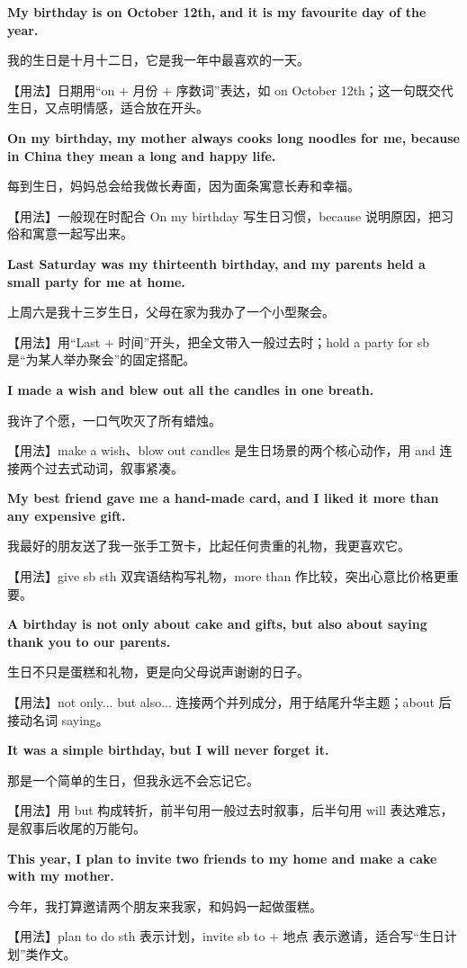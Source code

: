 \documentclass[UTF8,a4paper,11pt,oneside]{ctexbook}
\newcommand{\fansection}[1]{%
  \par\addvspace{2.4ex}%
  \Needspace{6\baselineskip}%
  \noindent{\sffamily\Large\bfseries\color{mainblue}#1}\par
  \nopagebreak
  \addvspace{0.2ex}%
  \noindent{\color{rulelight}\rule{\linewidth}{0.9pt}}\par
  \addvspace{0.9ex}%
  \nobreak
}
\newcommand{\fanpat}[3]{%
  \item{\bfseries #1}\par\nopagebreak
  {\small\color{textgray}#2}\par\nopagebreak
  {\footnotesize\color{accent!90!black}【用法】#3}\par
}
\begin{document}
\fansection{〇、本单元写作常用句型}
\begin{fanpatterns}
\fanpat{My birthday is on October 12th, and it is my favourite day of the year.}{我的生日是十月十二日，它是我一年中最喜欢的一天。}{日期用“on + 月份 + 序数词”表达，如 on October 12th；这一句既交代生日，又点明情感，适合放在开头。}

\fanpat{On my birthday, my mother always cooks long noodles for me, because in China they mean a long and happy life.}{每到生日，妈妈总会给我做长寿面，因为面条寓意长寿和幸福。}{一般现在时配合 On my birthday 写生日习惯，because 说明原因，把习俗和寓意一起写出来。}

\fanpat{Last Saturday was my thirteenth birthday, and my parents held a small party for me at home.}{上周六是我十三岁生日，父母在家为我办了一个小型聚会。}{用“Last + 时间”开头，把全文带入一般过去时；hold a party for sb 是“为某人举办聚会”的固定搭配。}

\fanpat{I made a wish and blew out all the candles in one breath.}{我许了个愿，一口气吹灭了所有蜡烛。}{make a wish、blow out candles 是生日场景的两个核心动作，用 and 连接两个过去式动词，叙事紧凑。}

\fanpat{My best friend gave me a hand-made card, and I liked it more than any expensive gift.}{我最好的朋友送了我一张手工贺卡，比起任何贵重的礼物，我更喜欢它。}{give sb sth 双宾语结构写礼物，more than 作比较，突出心意比价格更重要。}

\fanpat{A birthday is not only about cake and gifts, but also about saying thank you to our parents.}{生日不只是蛋糕和礼物，更是向父母说声谢谢的日子。}{not only... but also... 连接两个并列成分，用于结尾升华主题；about 后接动名词 saying。}

\fanpat{It was a simple birthday, but I will never forget it.}{那是一个简单的生日，但我永远不会忘记它。}{用 but 构成转折，前半句用一般过去时叙事，后半句用 will 表达难忘，是叙事后收尾的万能句。}

\fanpat{This year, I plan to invite two friends to my home and make a cake with my mother.}{今年，我打算邀请两个朋友来我家，和妈妈一起做蛋糕。}{plan to do sth 表示计划，invite sb to + 地点 表示邀请，适合写“生日计划”类作文。}

\end{fanpatterns}

\fansection{一、满分范文}
\end{document}
